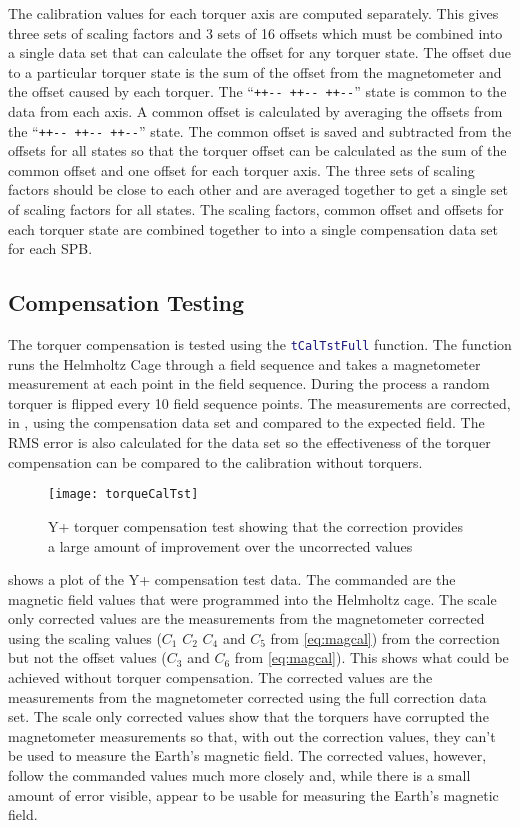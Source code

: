 The calibration values for each torquer axis are computed separately. This gives three sets of scaling factors and 3 sets of 16 offsets which must be combined into a single data set that can calculate the offset for any torquer state. The offset due to a particular torquer state is the sum of the offset from the magnetometer and the offset caused by each torquer. The \enquote{\texttt{++-{}- ++-{}- ++-{}-}} state is common to the data from each axis. A common offset is calculated by averaging the offsets from the \enquote{\texttt{++-{}- ++-{}- ++-{}-}} state. The common offset is saved and subtracted from the offsets for all states so that the torquer offset can be calculated as the sum of the common offset and one offset for each torquer axis. The three sets of scaling factors should be close to each other and are averaged together to get a single set of scaling factors for all states. The scaling factors, common offset and offsets for each torquer state are combined together to into a single compensation data set for each \ac{SPB}.

\subsection{Compensation Testing}
\label{sec:tq-comp-tst}

The torquer compensation is tested using the \lstinline[style=code,language=Matlab]$tCalTstFull$ function. The function runs the Helmholtz Cage through a field sequence and takes a magnetometer measurement at each point in the field sequence. During the process a random torquer is flipped every 10 field sequence points. The measurements are corrected, in \matlab, using the compensation data set and compared to the expected field. The RMS error is also calculated for the data set so the effectiveness of the torquer compensation can be compared to the calibration without torquers.

\begin{figure}[!ht]
    \centering
    \texttt{[image: torqueCalTst]}
    \caption{Y+ torquer compensation test showing that the correction provides a large amount of improvement over the uncorrected values}
    \label{fig:tqtst}
\end{figure}

 shows a plot of the Y+ compensation test data. The commanded are the magnetic field values that were programmed into the Helmholtz cage. The scale only corrected values are the measurements from the magnetometer corrected using the scaling values ($C_1$ $C_2$ $C_4$ and $C_5$ from \cref{eq:magcal}) from the correction but not the offset values ($C_3$ and $C_6$ from \cref{eq:magcal}). This shows what could be achieved without torquer compensation. The corrected values are the measurements from the magnetometer corrected using the full correction data set. The scale only corrected values show that the torquers have corrupted the magnetometer measurements so that, with out the correction values, they can't be used to measure the Earth's magnetic field. The corrected values, however, follow the commanded values much more closely and, while there is a small amount of error visible, appear to be usable for measuring the Earth's magnetic field.

